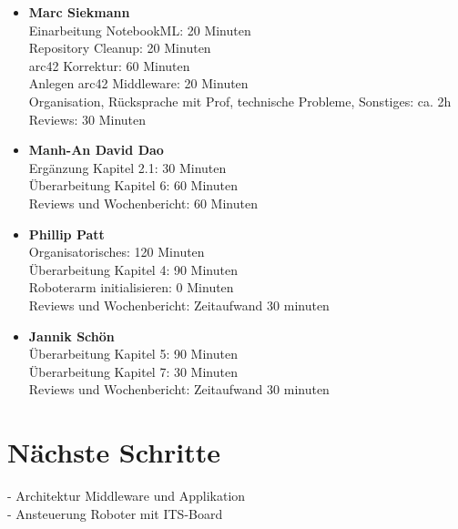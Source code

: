 \documentclass{article}
\begin{document}
\begin{itemize}
\item \textbf{Marc Siekmann} \\
Einarbeitung NotebookML: 20 Minuten\\
Repository Cleanup: 20 Minuten\\
arc42 Korrektur: 60 Minuten\\
Anlegen arc42 Middleware: 20 Minuten\\
Organisation, Rücksprache mit Prof, technische Probleme, Sonstiges: ca. 2h\\
Reviews: 30 Minuten

\item \textbf{Manh-An David Dao}\\
Ergänzung Kapitel 2.1: 30 Minuten\\
Überarbeitung Kapitel 6: 60 Minuten\\
Reviews und Wochenbericht: 60 Minuten\\ 

\item \textbf{Phillip Patt}\\
Organisatorisches: 120 Minuten \\ 
Überarbeitung Kapitel 4: 90 Minuten \\ 
Roboterarm initialisieren: 0 Minuten\\ 
Reviews und Wochenbericht: Zeitaufwand 30 minuten \\

\item \textbf{Jannik Schön}\\
Überarbeitung Kapitel 5: 90 Minuten \\ 
Überarbeitung Kapitel 7: 30 Minuten \\
Reviews und Wochenbericht: Zeitaufwand 30 minuten \\

\end{itemize}


\section{Nächste Schritte}
- Architektur Middleware und Applikation\\
- Ansteuerung Roboter mit ITS-Board
\end{document}
